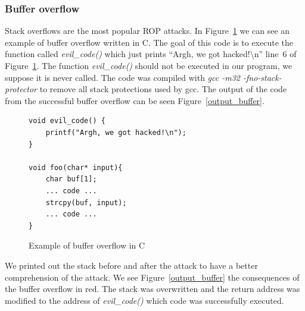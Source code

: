 \documentclass[11pt]{sdm}
\begin{document}
\subsubsection{Buffer overflow}
\label{ssub:Buffer overflow}

Stack overflows are the most popular ROP attacks. In Figure~\ref{buffer_overflow_code} we can see an example of buffer overflow written in C.
The goal of this code is to execute the function called \textit{evil\_code()} which just prints ``Argh, we got hacked!\textbackslash{n}'' line~6 of Figure~\ref{buffer_overflow_code}. The function \textit{evil\_code()} should not be executed in our program, we suppose it is never called.
The code was compiled with \textit{gcc -m32 -fno-stack-protector} to remove all stack protections used by gcc. The output of the code from the successful buffer overflow can be seen Figure~\ref{output_buffer}.
\begin{figure}[!ht]
\begin{lstlisting}
void evil_code() {
	printf("Argh, we got hacked!\n");
}

void foo(char* input){
	char buf[1];
	... code ...
	strcpy(buf, input);
	... code ...
}
\end{lstlisting}
\centering
\caption{Example of buffer overflow in C}
\label{buffer_overflow_code}
\end{figure}

We printed out the stack before and after the attack to have a better comprehension of the attack.
We see Figure~\ref{output_buffer} the consequences of the buffer overflow in red. The stack was overwritten and the return address was modified to the address of \textit{evil\_code()} which code was successfully executed.
\end{document}
